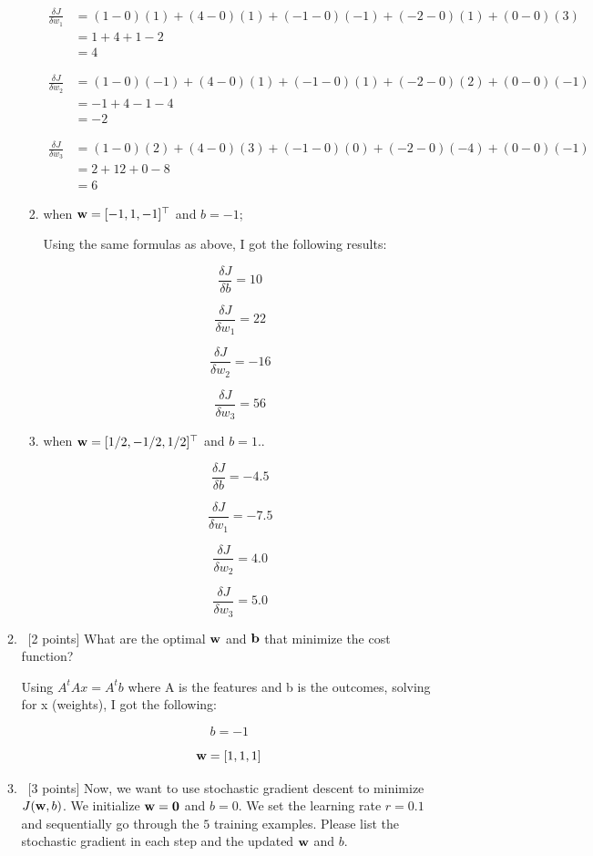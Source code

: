 \documentclass[12pt, fullpage,letterpaper]{article}
\begin{document}
\begin{enumerate}
\begin{enumerate}
\begin{enumerate}
		\[
			\begin{split}
				\frac{\delta J}{\delta w_1} &= (1-0)(1) + (4-0)(1) + (-1-0)(-1) + (-2-0)(1)+ (0-0)(3)\\
					&= 1 + 4 + 1 - 2\\
					&= 4
			\end{split}
		\]
		
		\[
			\begin{split}
				\frac{\delta J}{\delta w_2} &= (1-0)(-1) + (4-0)(1) + (-1-0)(1) + (-2-0)(2)+ (0-0)(-1)\\
					&= -1 + 4 -1 - 4\\
					&= -2
			\end{split}
		\]
		
		\[
			\begin{split}
				\frac{\delta J}{\delta w_3} &= (1-0)(2) + (4-0)(3) + (-1-0)(0) + (-2-0)(-4)+ (0-0)(-1)\\
					&= 2 + 12 + 0 - 8\\
					&= 6
			\end{split}
		\]
		
		\item when ${\bf w} = [-1,1,-1]^\top$ and $b = -1$;
		
		Using the same formulas as above, I got the following results:
		
		\[
				\frac{\delta J}{\delta b} = 10
		\]
		
		\[
				\frac{\delta J}{\delta w_1} = 22
		\]
		
		\[
				\frac{\delta J}{\delta w_2} = -16
		\]
		
		\[
				\frac{\delta J}{\delta w_3} = 56
		\]
		
		\item when ${\bf w} = [1/2,-1/2,1/2]^\top$ and $b = 1$..
		
		\[
				\frac{\delta J}{\delta b} = -4.5
		\]
		
		\[
				\frac{\delta J}{\delta w_1} = -7.5
		\]
		
		\[
				\frac{\delta J}{\delta w_2} = 4.0
		\]
		
		\[
				\frac{\delta J}{\delta w_3} = 5.0
		\]
		
	\end{enumerate}
	\item~[2 points] What are the optimal ${\bf w}$ and ${\bf b}$ that minimize the cost function? 
	
	Using $A^tA x = A^tb$ where A is the features and b is the outcomes, solving for x (weights), I got the following:
	
	\[
		b = -1
	\]

	\[
		{\bf w} = [1, 1, 1]
	\]	
	
	\item~[3 points] Now, we want to use stochastic gradient descent to minimize $J({\bf w}, b)$. We initialize ${\bf w} = {\bf 0}$ and $b = 0$. We set the learning rate $r = 0.1$ and sequentially go through the $5$ training examples. Please list the stochastic gradient in each step and the updated ${\bf w}$ and $b$.  
\end{enumerate}
\end{enumerate}
\end{document}

